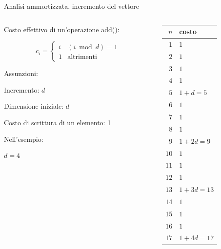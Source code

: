 \begin{frame}{Analisi ammortizzata, incremento del vettore}

\begin{columns}[T]
\begin{column}{0.6\textwidth}
\alert{Costo effettivo di un'operazione \textsf{add}()}:

\[
c_i = \begin{cases} 
     i & \textrm{$(i \bmod d) = 1$}\\
     1 & \textrm{altrimenti}
  \end{cases}
\]

\bigskip
Assunzioni:
\BI
\item Incremento: $d$
\item Dimensione iniziale: $d$
\item Costo di scrittura di un elemento: 1
\EI

\bigskip
Nell'esempio:
\BI
\item $d=4$
\EI



\end{column}
\hfill
\begin{column}{0.30\textwidth}
{\footnotesize
\begin{tabular}{|r|l|}
\hline
$n$ & costo \\
\hline
$1$ & $1$ \\
$2$ & $1$ \\
$3$ & $1$ \\
$4$ & $1$ \\
$5$ & $1 + d = 5$\\
$6$ & $1$ \\
$7$ & $1$ \\
$8$ & $1$ \\
$9$ & $1 + 2d = 9$ \\
$10$ & $1$ \\
$11$ & $1$ \\
$12$ & $1$ \\
$13$ & $1 + 3d = 13$ \\
$14$ & $1$ \\
$15$ & $1$ \\
$16$ & $1$ \\
$17$ & $1 + 4d = 17$ \\
\hline
\end{tabular}
}
\end{column}
\end{columns}

\end{frame}

